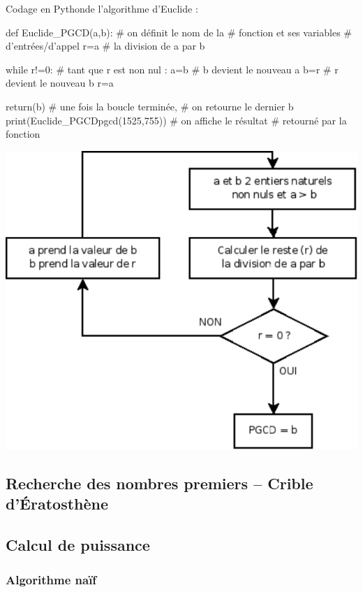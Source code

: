 \documentclass[10pt]{article}
\begin{document}
\begin{minipage}[c]{.48\linewidth}
\begin{py}
Codage en Pythonde l'algorithme d'Euclide :
\begin{python}
def Euclide_PGCD(a,b):	# on définit le nom de la 
			# fonction et ses variables 
			# d'entrées/d'appel
    r=a%
			# la division de a par b
    
    while r!=0:		# tant que r est non nul :
        a=b		# b devient le nouveau a
        b=r		# r devient le nouveau b
        r=a%
        
    return(b)		# une fois la boucle terminée, 
			# on retourne le dernier b    
print(Euclide_PGCDpgcd(1525,755))	
			# on affiche le résultat 
			# retourné par la fonction
\end{python}
\end{py}
\end{minipage}

\begin{center}
\includegraphics[width=.45\textwidth]{images/algo_euclide}
\end{center}
\subsection{Recherche des nombres premiers -- Crible d'Ératosthène}
\subsection{Calcul de puissance}
\subsubsection{Algorithme naïf}
%    
%    
%    
\end{document}
